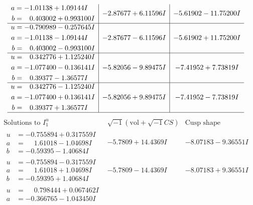 \documentclass[1p]{elsarticle_modified}
\theoremstyle{definition}
\newcommand{\I}{\sqrt{-1}}
\begin{document}
$$\begin{array}{c|c|c}
\begin{aligned}
a &= -1.01138 + 1.09144 I \\
b &= \phantom{-}0.403002 + 0.993100 I\end{aligned}
 & -2.87677 + 6.11596 I & -5.61902 - 11.75200 I \\ \hline\begin{aligned}
u &= -0.790989 - 0.257645 I \\
a &= -1.01138 - 1.09144 I \\
b &= \phantom{-}0.403002 - 0.993100 I\end{aligned}
 & -2.87677 - 6.11596 I & -5.61902 + 11.75200 I \\ \hline\begin{aligned}
u &= \phantom{-}0.342776 + 1.125240 I \\
a &= -1.077400 - 0.136141 I \\
b &= \phantom{-}0.39377 - 1.36577 I\end{aligned}
 & -5.82056 - 9.89475 I & -7.41952 + 7.73819 I \\ \hline\begin{aligned}
u &= \phantom{-}0.342776 - 1.125240 I \\
a &= -1.077400 + 0.136141 I \\
b &= \phantom{-}0.39377 + 1.36577 I\end{aligned}
 & -5.82056 + 9.89475 I & -7.41952 - 7.73819 I\\
 \hline 
 \end{array}$$\newpage$$\begin{array}{c|c|c}  
\text{Solutions to }I^u_{1}& \I (\text{vol} + \sqrt{-1}CS) & \text{Cusp shape}\\
 \hline 
\begin{aligned}
u &= -0.755894 + 0.317559 I \\
a &= \phantom{-}1.61018 - 1.04698 I \\
b &= -0.59395 - 1.40684 I\end{aligned}
 & -5.7809 + 14.4369 I & -8.07183 - 9.36551 I \\ \hline\begin{aligned}
u &= -0.755894 - 0.317559 I \\
a &= \phantom{-}1.61018 + 1.04698 I \\
b &= -0.59395 + 1.40684 I\end{aligned}
 & -5.7809 - 14.4369 I & -8.07183 + 9.36551 I \\ \hline\begin{aligned}
u &= \phantom{-}0.798444 + 0.067462 I \\
a &= -0.366765 - 1.043450 I \\

\end{aligned}
\end{array}$$
\end{document}
